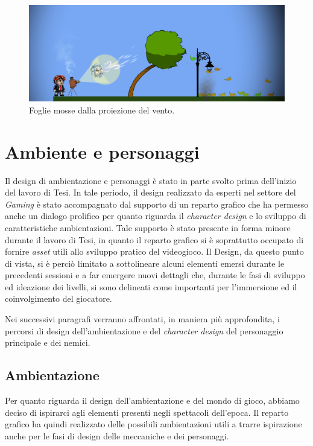 \begin{figure}%
	\centering
	\includegraphics[width= 0.9\columnwidth]{images/gameDesign/27_foglie.jpg}
	\caption{Foglie mosse dalla proiezione del vento.}
	\label{fig:rigiocabilita_foglie}
\end{figure} 

\section{Ambiente e personaggi}
\label{sec:ambiente_personaggi}

Il design di ambientazione e personaggi è stato in parte svolto prima dell’inizio del lavoro di Tesi. In tale periodo, il design realizzato da esperti nel settore del \textit{Gaming} è stato accompagnato dal supporto di un reparto grafico che ha permesso anche un dialogo prolifico per quanto riguarda il \textit{character design} e lo sviluppo di caratteristiche ambientazioni. Tale supporto è stato presente in forma minore durante il lavoro di Tesi, in quanto il reparto grafico si è soprattutto occupato di fornire \textit{asset} utili allo sviluppo pratico del videogioco. Il Design, da questo punto di vista, si è perciò limitato a sottolineare alcuni elementi emersi durante le precedenti sessioni e a far emergere nuovi dettagli che, durante le fasi di sviluppo ed ideazione dei livelli, si sono delineati come importanti per l’immersione ed il coinvolgimento del giocatore.

Nei successivi paragrafi verranno affrontati, in maniera più approfondita, i percorsi di design dell’ambientazione e del \textit{character design} del personaggio principale e dei nemici.

\subsection{Ambientazione}
\label{sec:ambientazione}

Per quanto riguarda il design dell’ambientazione e del mondo di gioco, abbiamo deciso di ispirarci agli elementi presenti negli spettacoli dell’epoca. Il reparto grafico ha quindi realizzato delle possibili ambientazioni utili a trarre ispirazione anche per le fasi di design delle meccaniche e dei personaggi.

